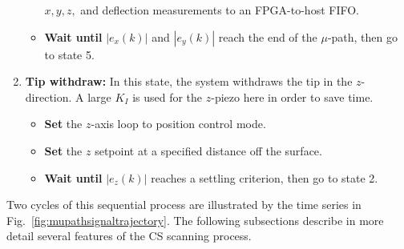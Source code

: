 \documentclass[twocolumn,twoside]{IEEEtran/IEEEtran}
\begin{document}
\begin{enumerate}
\begin{itemize}
    $x,y,z,$ and deflection measurements to an FPGA-to-host FIFO.
  \item \textbf{Wait until} $|e_x(k)|$ and $|e_y(k)|$ reach the end of the
    $\mu$-path,
    then go to state 5.
  \end{itemize}
\item \textbf{Tip withdraw:} In this state, the system withdraws the tip in the
  $z$-direction. A large $K_I$ is used for the $z$-piezo here in order to save
  time.
  \begin{itemize}
  \item \textbf{Set} the $z$-axis loop to position control mode.
  \item \textbf{Set} the $z$ setpoint at a specified distance off the surface.
  \item \textbf{Wait until} $|e_z(k)|$ reaches a settling criterion, then go to
    state 2.
  \end{itemize}
\end{enumerate}
	
Two cycles of this sequential process are illustrated by the time series in
Fig.~\ref{fig:mupathsignaltrajectory}. The following subsections describe in
more detail several features of the CS scanning process.
	

\end{document}
